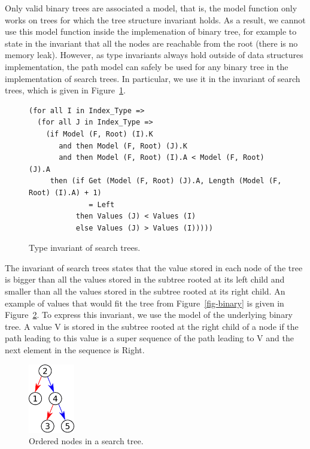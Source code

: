 \documentclass[11pt,a4paper]{article}
\begin{document}
Only valid binary trees are associated a model, that is, the model function
only works on trees for which the tree structure invariant holds. As a result,
we cannot use this model function inside the implemenation of binary tree,
for example to state in the invariant that all the nodes are reachable from the
root (there is no memory leak). However, as type invariants always hold outside
of data structures implementation, the path model can safely be used for any
binary tree in the implementation of search trees. In particular, we use it
in the invariant of search trees, which is given in Figure~\ref{fig-search-inv}.

\begin{figure}[ht]
\begin{small}
\begin{lstlisting}
(for all I in Index_Type =>
  (for all J in Index_Type =>
    (if Model (F, Root) (I).K
       and then Model (F, Root) (J).K
       and then Model (F, Root) (I).A < Model (F, Root) (J).A
     then (if Get (Model (F, Root) (J).A, Length (Model (F, Root) (I).A) + 1)
              = Left
           then Values (J) < Values (I)
           else Values (J) > Values (I)))))
\end{lstlisting}
\end{small}
\caption{\label{fig-search-inv} Type invariant of search trees.}
\end{figure}

The invariant of search trees states that the value stored in each node of the
tree is bigger than all the values stored in the subtree rooted at its left
child and smaller than all the values stored in the subtree rooted at its right
child. An example of values that would fit the tree from Figure~\ref{fig-binary}
is given in Figure~\ref{fig-search}. To express this invariant, we use the
model of the underlying binary tree. A value V is stored in the subtree rooted
at the right child of a node if the path leading to this value is a super sequence
of the path leading to V and the next element in the sequence is Right.

\begin{figure}[ht]
\begin{center}
\includegraphics[width=2cm]{search.pdf}
\caption{\label{fig-search} Ordered nodes in a search tree.}
\end{center}
\end{figure}
\end{document}
